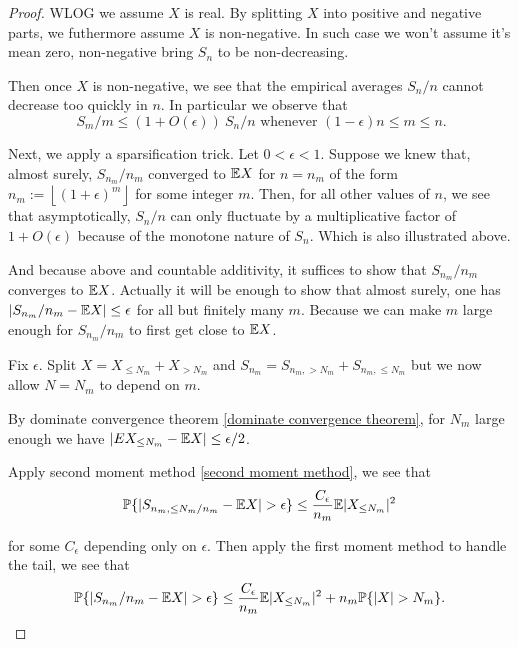 \begin{proof}
    WLOG we assume $X$ is real. By splitting $X$ into positive and negative parts, we futhermore assume $X$ is non-negative. In such case we won't assume it's mean zero, non-negative bring $S_n$ to be non-decreasing.

    Then once $X$ is non-negative, we see that the empirical averages $S_n/n$ cannot decrease too quickly in $n$. In particular we observe that 
    \begin{equation*}
        \ S_m/m \leq (1+O(\epsilon)) \ S_n/n \text{ whenever } (1-\epsilon) n \leq m \leq n.
    \end{equation*}

    Next, we apply a sparsification trick. Let $0<\epsilon<1$. Suppose we knew that, almost surely, $S_{n_m}/n_m$ converged to $\mathbb{E} X$ for $n=n_m$ of the form $n_m:= \left\lfloor  (1+\epsilon)^m\right\rfloor$ for some integer $m$. 
    Then, for all other values of $n$, we see that asymptotically, $S_n/n$ can only fluctuate by a multiplicative factor of $1+O(\epsilon)$ because of the monotone nature of $S_n$. 
    Which is also illustrated above.
    
    And because above and countable additivity, it suffices to show that $S_{n_m}/n_m$ converges to $\mathbb{E} X$. 
    Actually it will be enough to show that almost surely, one has $|S_{n_m}/n_m -\mathbb{E} X|\leq \epsilon$ for all but finitely many $m$. Because we can make $m$ large enough for $S_{n_m}/n_m$ to first get close to $\mathbb{E} X$.

    Fix $\epsilon$. Split $X=X_{\leq N_m} + X_{>N_m}$ and $S_{n_m} = S_{n_m,>N_m} + S_{n_m,\leq N_m}$ but we now allow $N=N_m$ to depend on $m$.

    By dominate convergence theorem \ref{dominate convergence theorem}, for $N_m$ large enough we have $|EX_{\leq N_m}-\mathbb{E} X| \leq \epsilon/2$.

    Apply second moment method \ref{second moment method}, we see that 
    \begin{equation*}
        \Pb\{|S_{n_m,\leq N_m/n_m} -\E X|> \epsilon \} \leq \frac{C_\epsilon}{n_m} \E |X_{\leq N_m}|^2
    \end{equation*}

    for some $C_\epsilon$ depending only on $\epsilon$. Then apply the first moment method to handle the tail, we see that 
    \begin{equation*}
        \Pb\{|S_{n_m}/n_m-\E X|>\epsilon \} \leq \frac{C_\epsilon}{n_m} \E |X_{\leq N_m}|^2 +n_m \Pb\{|X|>N_m\}.
    \end{equation*}


\end{proof}

